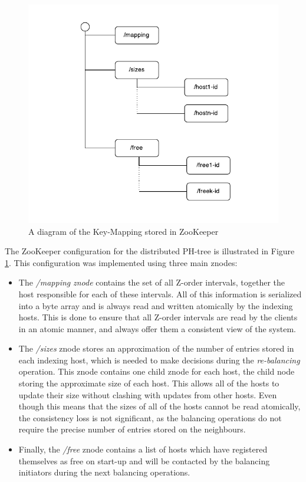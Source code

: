 \documentclass[11pt,a4paper]{globis-book}
\begin{document}
\begin{figure}[h]
    \centering 
    \includegraphics[scale=1.1]{images/KeyMapping}
    \caption{A diagram of the Key-Mapping stored in ZooKeeper}
    \label{fig:KeyMapping}
\end{figure}

The ZooKeeper configuration for the distributed PH-tree is illustrated in Figure \ref{fig:KeyMapping}. This configuration was implemented using three main znodes:
\begin{itemize}
    \item The \textit{/mapping} \textit{znode} contains the set of all Z-order intervals, together the host responsible for each of these intervals. All of this information is serialized into a byte array and is always read and written atomically by the indexing hosts. This is done to ensure that all Z-order intervals are read by the clients in an atomic manner, and always offer them a consistent view of the system. 
    \item The \textit{/sizes} znode stores an approximation of the number of entries stored in each indexing host, which is needed to make decisions during the \textit{re-balancing} operation. This znode contains one child znode for each host, the child node storing the approximate size of each host. This allows all of the hosts to update their size without clashing with updates from other hosts. Even though this means that the sizes of all of the hosts cannot be read atomically, the consistency loss is not significant, as the balancing operations do not require the precise number of entries stored on the neighbours. 
    \item Finally, the \textit{/free} znode contains a list of hosts which have registered themselves as free on start-up and will be contacted by the balancing initiators during the next balancing operations.
\end{itemize}
\end{document}
